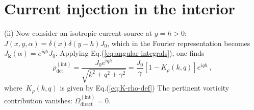 \documentclass[preprint,aps,eqsecnum, prb]{revtex4-1}
\newcommand{\dct}[1]{{#1}_\mathrm{dct}}
\begin{document}
\section{Current injection in the interior}
\label{sec:bulk-src}
(ii) Now consider an isotropic current source at $y = h > 0$:
$J(x, y, \alpha) = \delta(x) \delta(y - h) J_0 $,
which in the Fourier representation becomes
$J_{\bm k}(\alpha) = e^{i q h} J_0$.
Applying Eq.(\ref{eq:angular-integrals}), one finds
\begin{equation}
  \label{eq:source-bulk-rho}
  \dct{\rho}^\mathrm{(int)}
  = \frac{J_0 e^{i q h}}{\sqrt{k^2 + q^2 + \gamma^2}}
  = \frac{J_0}{\gamma} \left[1 - K_\rho(k, q) \right]e^{i q h}
  \ ,
\end{equation}
where~$K_\rho(k, q)$ is given by Eq.(\ref{eq:K-rho-def})
The pertinent vorticity contribution vanishes:
$\Omega_\mathrm{direct}^\mathrm{(int)} = 0$.
\end{document}
